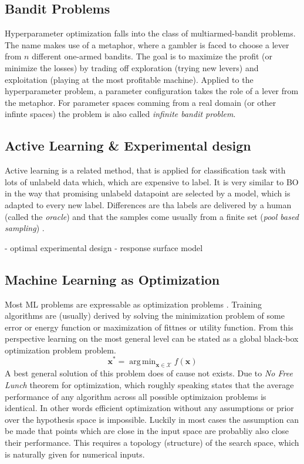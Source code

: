 \documentclass[english]{article}
\newcommand{\x}{\mathbf{x}}
\DeclareMathOperator*{\argmin}{arg\,min}
\begin{document}
\subsection{Bandit Problems}
Hyperparameter optimization falls into the class of multiarmed-bandit problems. The name makes use of a metaphor, where a gambler is faced to choose a lever from $n$ different one-armed bandits. The goal is to maximize the profit (or minimize the losses) by trading off exploration (trying new levers) and exploitation (playing at the most profitable machine). Applied to the hyperparameter problem, a parameter configuration takes the role of a lever from the metaphor. For parameter spaces comming from a real domain (or other infinte spaces) the problem is also called \textit{infinite bandit problem}.



\subsection{Active Learning \& Experimental design}
Active learning is a related method, that is applied for classification task with lots of unlabeld data which, which are expensive to label. It is very similar to BO in the way that promising unlabeld datapoint are selected by a model, which is adapted to every new label. Differences are tha labels are delivered by a human (called the \textit{oracle}) and that the samples come usually from a finite set (\textit{pool based sampling}) \cite{settles_active_2010}.

 - optimal experimental design
 - response surface model

\subsection{Machine Learning as Optimization}
Most \acf{ML} problems are expressable as optimization problems \cite{bennett_interplay_2006}. Training algorithms are (usually) derived by solving the minimization problem of some error or energy function or maximization of fittnes or utility function. From this perspective learning on the most general level can be stated as a global black-box optimization problem problem.
$$\x^* = \argmin_{\x \in \mathcal{X}} f(\x)$$
A best general solution of this problem does of cause not exists. Due to \textit{No Free Lunch} theorem for optimization, which roughly speaking states that the average performance of any algorithm across all possible optimizaion problems is identical. In other words efficient optimization without any assumptions or prior over the hypothesis space is impossible. Luckily in most cases the assumption can be made that points which are close in the input space are probabliy also close their performance. This requires a topology (structure) of the search space, which is naturally given for numerical inputs.
\end{document}
